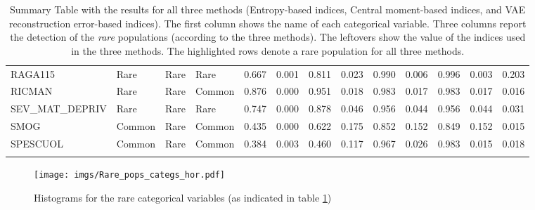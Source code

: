 \begin{tiny}
\begin{longtable}{|l|l|l|l|r|r|r|r|r|r|r|r|r|}
    \rowcolor{Kol2023}
    RAGA115 &            Rare &                         Rare &           Rare &          0.667 &   0.001 &                    0.811 &                  0.023 &                  0.990 &                  0.006 &                  0.996 &                  0.003 &              0.203 \\
    RICMAN &            Rare &                         Rare &         Common &          0.876 &   0.000 &                    0.951 &                  0.018 &                  0.983 &                  0.017 &                  0.983 &                  0.017 &              0.016 \\
    \rowcolor{Kol2023}
    SEV\_MAT\_DEPRIV &            Rare &                         Rare &         Rare &          0.747 &   0.000 &                    0.878 &                  0.046 &                  0.956 &                  0.044 &                  0.956 &                  0.044 &              0.031 \\
    SMOG &          Common &                         Rare &         Common &          0.435 &   0.000 &                    0.622 &                  0.175 &                  0.852 &                  0.152 &                  0.849 &                  0.152 &              0.015 \\
    SPESCUOL &          Common &                         Rare &         Common &          0.384 &   0.003 &                    0.460 &                  0.117 &                  0.967 &                  0.026 &                  0.983 &                  0.015 &              0.018 \\
    \hline
    \caption{Summary Table with the results for all three methods (Entropy-based indices, Central moment-based indices, and VAE reconstruction error-based indices). 
    The first column shows the name of each categorical variable. Three columns report the detection of the \emph{rare} populations (according to the three methods). The leftovers show the value of the indices used in the three methods.
    The highlighted rows denote a rare population for all three methods.
    }
    \label{tab: summary_table_indices}
\end{longtable}
\end{tiny}
\begin{figure}[!]
    \centering
    \texttt{[image: imgs/Rare\_pops\_categs\_hor.pdf]}
    \caption{Histograms for the rare categorical variables (as indicated in table \ref{tab: summary_table_indices})}
    \label{fig: Hist_rare_catgs}
\end{figure}

